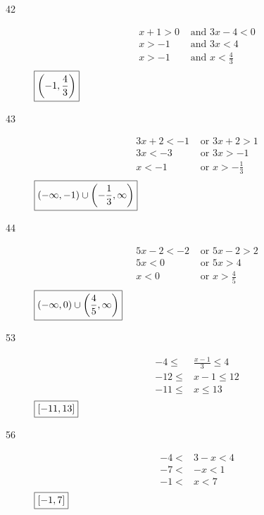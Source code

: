 \documentclass[letterpaper]{exam}
\begin{document}
\begin{description}
      \item[42]
        \begin{align*}
          x + 1 > 0 & \text{ and } 3x - 4 < 0 \\
          x > -1    & \text{ and } 3x < 4 \\
          x > -1    & \text{ and } x < \frac{4}{3} \\
        \end{align*}
        $\boxed{ \intoo{ -1, \frac{4}{3} } }$

      \item[43]
        \begin{align*}
          3x + 2 < -1 & \text{ or } 3x + 2 > 1 \\
          3x < -3     & \text{ or } 3x > -1 \\
          x < -1      & \text{ or } x > - \frac{1}{3} \\
        \end{align*}
        $\boxed{ \intoo{ -\infty, -1 } \cup \intoo{ -\frac{1}{3}, \infty } }$

      \item[44]
        \begin{align*}
          5x - 2 < -2 & \text{ or } 5x - 2 > 2 \\
          5x < 0      & \text{ or } 5x > 4 \\
          x < 0       & \text{ or } x > \frac{4}{5} \\
        \end{align*}
        $\boxed{ \intoo{ -\infty, 0 } \cup \intoo{ \frac{4}{5}, \infty } }$

      \item[53]
        \begin{align*}
          -4 \leq  & \frac{x - 1}{3} \leq 4 \\
          -12 \leq & x - 1           \leq 12 \\
          -11 \leq & x               \leq 13 \\
        \end{align*}
        $\boxed{ \intcc{ -11, 13 } }$

      \item[56]
        \begin{align*}
          -4 < & 3 - x < 4 \\
          -7 < & -x    < 1 \\
          -1 < & x     < 7 \\
        \end{align*}
        $\boxed{ \intcc{ -1, 7 } }$


\end{description}
\end{document}
